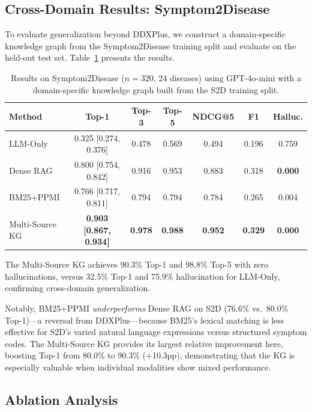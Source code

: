 \documentclass[preprint,12pt]{elsarticle}
\begin{document}
\subsection{Cross-Domain Results: Symptom2Disease}
\label{sec:cross_domain}

To evaluate generalization beyond DDXPlus, we construct a domain-specific knowledge graph from the Symptom2Disease training split and evaluate on the held-out test set. Table~\ref{tab:s2d} presents the results.

\begin{table}[t]
\centering
\caption{Results on Symptom2Disease ($n{=}320$, 24 diseases) using GPT-4o-mini with a domain-specific knowledge graph built from the S2D training split.}
\label{tab:s2d}
\begin{tabular}{lcccccc}
\toprule
\textbf{Method} & \textbf{Top-1} & \textbf{Top-3} & \textbf{Top-5} & \textbf{NDCG@5} & \textbf{F1} & \textbf{Halluc.} \\
\midrule
LLM-Only       & 0.325 [0.274, 0.376] & 0.478 & 0.569 & 0.494 & 0.196 & 0.759 \\
Dense RAG       & 0.800 [0.754, 0.842] & 0.916 & 0.953 & 0.883 & 0.318 & \textbf{0.000} \\
BM25+PPMI       & 0.766 [0.717, 0.811] & 0.794 & 0.794 & 0.784 & 0.265 & 0.004 \\
Multi-Source KG & \textbf{0.903 [0.867, 0.934]} & \textbf{0.978} & \textbf{0.988} & \textbf{0.952} & \textbf{0.329} & \textbf{0.000} \\
\bottomrule
\end{tabular}
\end{table}

The Multi-Source KG achieves 90.3\% Top-1 and 98.8\% Top-5 with zero hallucinations, versus 32.5\% Top-1 and 75.9\% hallucination for LLM-Only, confirming cross-domain generalization.

Notably, BM25+PPMI \emph{underperforms} Dense RAG on S2D (76.6\% vs.\ 80.0\% Top-1)---a reversal from DDXPlus---because BM25's lexical matching is less effective for S2D's varied natural language expressions versus structured symptom codes. The Multi-Source KG provides its largest relative improvement here, boosting Top-1 from 80.0\% to 90.3\% (+10.3pp), demonstrating that the KG is especially valuable when individual modalities show mixed performance.

\subsection{Ablation Analysis}
\label{sec:ablation}
\end{document}
